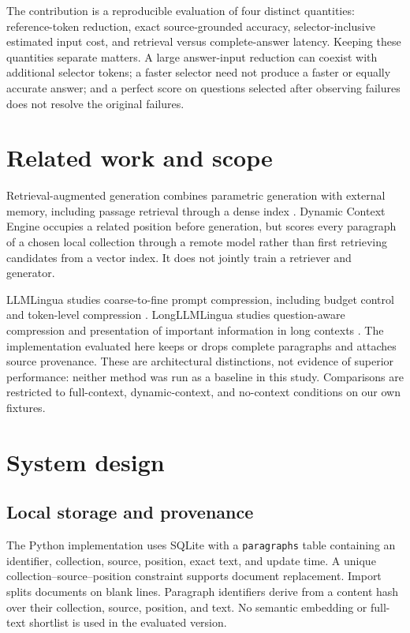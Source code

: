 \documentclass[11pt]{article}
\begin{document}
The contribution is a reproducible evaluation of four distinct quantities: reference-token reduction, exact source-grounded accuracy, selector-inclusive estimated input cost, and retrieval versus complete-answer latency. Keeping these quantities separate matters. A large answer-input reduction can coexist with additional selector tokens; a faster selector need not produce a faster or equally accurate answer; and a perfect score on questions selected after observing failures does not resolve the original failures.

\section{Related work and scope}
Retrieval-augmented generation combines parametric generation with external memory, including passage retrieval through a dense index \cite{rag}. Dynamic Context Engine occupies a related position before generation, but scores every paragraph of a chosen local collection through a remote model rather than first retrieving candidates from a vector index. It does not jointly train a retriever and generator.

LLMLingua studies coarse-to-fine prompt compression, including budget control and token-level compression \cite{llmlingua}. LongLLMLingua studies question-aware compression and presentation of important information in long contexts \cite{longllmlingua}. The implementation evaluated here keeps or drops complete paragraphs and attaches source provenance. These are architectural distinctions, not evidence of superior performance: neither method was run as a baseline in this study. Comparisons are restricted to full-context, dynamic-context, and no-context conditions on our own fixtures.

\section{System design}
\subsection{Local storage and provenance}
The Python implementation uses SQLite with a \texttt{paragraphs} table containing an identifier, collection, source, position, exact text, and update time. A unique collection--source--position constraint supports document replacement. Import splits documents on blank lines. Paragraph identifiers derive from a content hash over their collection, source, position, and text. No semantic embedding or full-text shortlist is used in the evaluated version.
\end{document}
